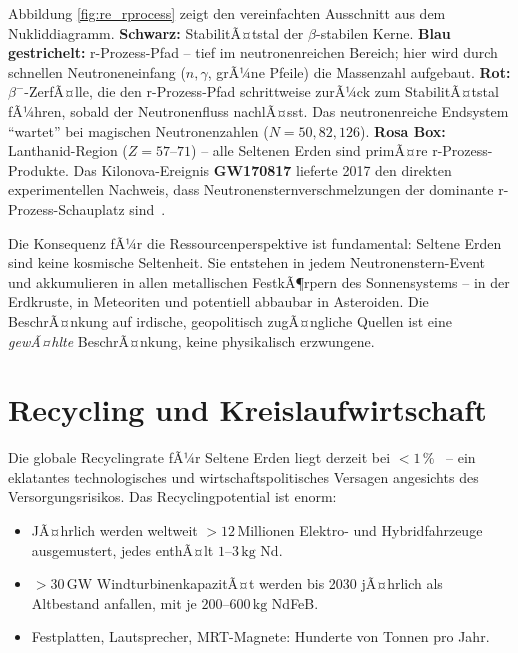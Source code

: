 ﻿\documentclass[12pt, a4paper]{report}
\theoremstyle{definition}
\theoremstyle{remark}
\begin{document}
Abbildung \ref{fig:re_rprocess} zeigt den vereinfachten Ausschnitt aus dem Nukliddiagramm. \textbf{Schwarz:} StabilitÃ¤tstal der $\beta$-stabilen Kerne.
\textbf{Blau gestrichelt:} r-Prozess-Pfad -- tief im neutronenreichen
Bereich; hier wird durch schnellen Neutroneneinfang ($n, \gamma$, grÃ¼ne
Pfeile) die Massenzahl aufgebaut.
\textbf{Rot:} $\beta^-$-ZerfÃ¤lle, die den r-Prozess-Pfad schrittweise
zurÃ¼ck zum StabilitÃ¤tstal fÃ¼hren, sobald der Neutronenfluss nachlÃ¤sst.
Das neutronenreiche Endsystem ``wartet'' bei magischen Neutronenzahlen
($N = 50, 82, 126$). \textbf{Rosa Box:} Lanthanid-Region ($Z = 57$--$71$) --
alle Seltenen Erden sind primÃ¤re r-Prozess-Produkte.
Das Kilonova-Ereignis \textbf{GW170817} lieferte 2017 den direkten
experimentellen Nachweis, dass Neutronensternverschmelzungen der
dominante r-Prozess-Schauplatz sind~\cite{abbott2016,smartt2017}.

Die Konsequenz fÃ¼r die Ressourcenperspektive ist fundamental: Seltene Erden
sind keine kosmische Seltenheit. Sie entstehen in jedem Neutronenstern-Event
und akkumulieren in allen metallischen FestkÃ¶rpern des Sonnensystems -- in
der Erdkruste, in Meteoriten und potentiell abbaubar in Asteroiden. Die
BeschrÃ¤nkung auf irdische, geopolitisch zugÃ¤ngliche Quellen ist eine
\emph{gewÃ¤hlte} BeschrÃ¤nkung, keine physikalisch erzwungene.

\section{Recycling und Kreislaufwirtschaft}
\label{ssec:re_recycling}

Die globale Recyclingrate fÃ¼r Seltene Erden liegt derzeit bei $< 1\,\%$~\cite{weng2015}
-- ein eklatantes technologisches und wirtschaftspolitisches Versagen angesichts
des Versorgungsrisikos. Das Recyclingpotential ist enorm:
\begin{itemize}
  \item JÃ¤hrlich werden weltweit $>12\,\text{Millionen}$ Elektro- und
        Hybridfahrzeuge ausgemustert, jedes enthÃ¤lt $1$--$3\,\text{kg}$ Nd.
  \item $>30\,\text{GW}$ WindturbinenkapazitÃ¤t werden bis 2030 jÃ¤hrlich als
        Altbestand anfallen, mit je $200$--$600\,\text{kg}$ NdFeB.
  \item Festplatten, Lautsprecher, MRT-Magnete: Hunderte von Tonnen pro Jahr.
\end{itemize}
\end{document}
